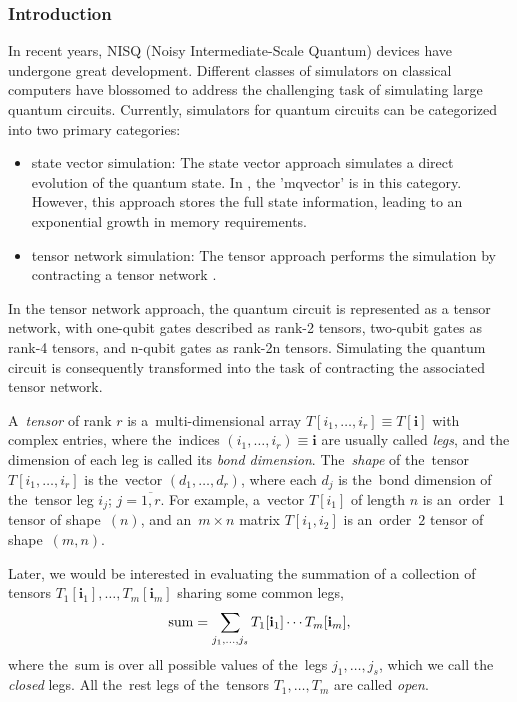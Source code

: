 \subsubsection{Introduction}
In recent years, NISQ (Noisy Intermediate-Scale Quantum) devices have undergone great development. Different classes of simulators on classical computers have blossomed to address the challenging task of simulating large quantum circuits. Currently, simulators for quantum circuits can be categorized into two primary categories: 
\begin{itemize}
\item state vector simulation: The state vector approach simulates a direct evolution of the quantum state. In \MindQuantum, the 'mqvector' is in this category. However, this approach stores the full state information, leading to an exponential growth in memory requirements.
\item tensor network simulation: The tensor approach performs the simulation by contracting a tensor network . 
\end{itemize}

In the tensor network approach, the quantum circuit is represented as a tensor network, with one-qubit gates described as rank-2 tensors, two-qubit gates as rank-4 tensors, and n-qubit gates as rank-2n tensors. Simulating the quantum circuit is consequently transformed into the task of contracting the associated tensor network. 

A~\emph{tensor} of rank $r$ is a~multi-dimensional array $T[i_1,\dots,i_r] \equiv T[\mathbf{i}]$ with complex entries, where the~indices $(i_1,\dots,i_r) \equiv \mathbf{i}$ are usually called \emph{legs}, and the dimension of each leg is called its \emph{bond dimension}. The~\emph{shape} of the~tensor $T[i_1,\dots,i_r]$ is the~vector $(d_1,\dots,d_r)$, where each $d_j$ is the~bond dimension of the~tensor leg $i_j$;  $j=\overline{1,r}$. For example, a~vector $T[i_1]$ of length $n$ is an~order~$1$ tensor of shape~$(n)$, and an~$m\times n$ matrix $T[i_1,i_2]$ is an~order~$2$ tensor of shape~$(m, n)$.

Later, we would be interested in evaluating the summation of a collection of tensors $T_1[\mathbf{i}_1],\dots, T_m[\mathbf{i}_m]$ sharing some common legs,
\begin{equation}\label{eq:sum}
    {\rm{sum}}=\sum_{j_1,\dots,j_s} T_1[\mathbf{i}_1]\cdots T_m[\mathbf{i}_m],
\end{equation}
where the~sum is over all possible values of the~legs $j_1,\dots,j_s$, which we call the \emph{closed} legs. All the~rest legs of the~tensors $T_1,\dots,T_m$ are called \emph{open}.

